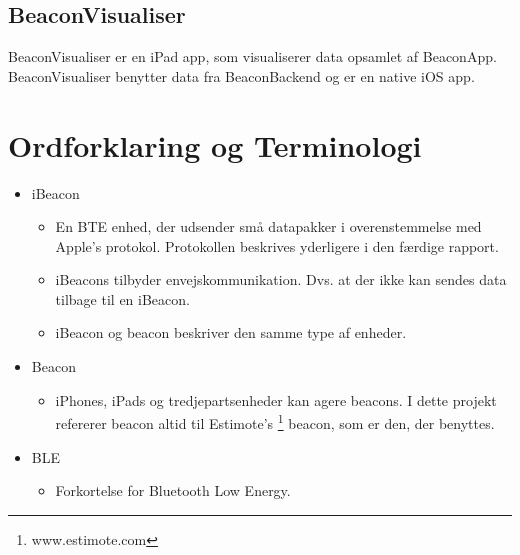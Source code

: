 \subsection{BeaconVisualiser}
BeaconVisualiser er en iPad app, som visualiserer data opsamlet af BeaconApp. BeaconVisualiser benytter data fra BeaconBackend og er en native iOS app.

\section{Ordforklaring og Terminologi}

\begin{itemize}
	\item iBeacon
		\begin{itemize}
			\item En BTE enhed, der udsender små datapakker i overenstemmelse med Apple's protokol. Protokollen beskrives yderligere i den færdige rapport.
			\item iBeacons tilbyder envejskommunikation. Dvs. at der ikke kan sendes data tilbage til en iBeacon.
			\item iBeacon og beacon beskriver den samme type af enheder.
		\end{itemize}
		
	\item Beacon
		\begin{itemize}
			\item iPhones, iPads og tredjepartsenheder kan agere beacons. I dette projekt refererer beacon altid til Estimote's \footnote{www.estimote.com} beacon, som er den, der benyttes.
		\end{itemize}
		
	\item BLE
		\begin{itemize}
			\item Forkortelse for Bluetooth Low Energy.
		\end{itemize}
\end{itemize}